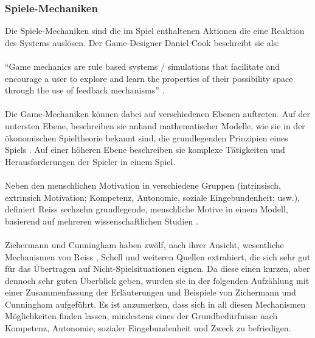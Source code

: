 \documentclass[a4paper,12pt]{scrartcl}
\begin{document}
\subsubsection{Spiele-Mechaniken}
Die Spiele-Mechaniken sind die im Spiel enthaltenen Aktionen die eine Reaktion des Systems auslösen. Der Game-Designer Daniel Cook beschreibt sie als:
\\\\
\enquote{Game mechanics are rule based systems / simulations that facilitate and encourage a user to explore and learn the properties of their possibility space through the use of feedback mechanisms} \cite{GameMechanics2006}. 
\\\\
Die Game-Mechaniken können dabei auf verschiedenen Ebenen auftreten. Auf der untersten Ebene, beschreiben sie anhand mathematischer Modelle, wie sie in der ökonomischen Spieltheorie bekannt sind, die grundlegenden Prinzipien eines Spiels \cite{Schell2014}. Auf einer höheren Ebene beschreiben sie komplexe Tätigkeiten und Herausforderungen der Spieler in einem Spiel.
\\\\
Neben den menschlichen Motivation in verschiedene Gruppen (intrinsisch, extrinsich Motivation; Kompetenz, Autonomie, soziale Eingebundenheit; usw.), definiert Reiss sechzehn grundlegende, menschliche Motive in einem Modell, basierend auf mehreren wissenschaftlichen Studien \cite{Reiss2009}.
\\\\
Zichermann und Cunningham \cite{Zichermann2011} haben zwölf, nach ihrer Ansicht, wesentliche Mechanismen von Reiss \cite{Reiss2009}, Schell \cite{Schell2014} und weiteren Quellen extrahiert, die sich sehr gut für das Übertragen auf Nicht-Spielsituationen eignen. Da diese einen kurzen, aber dennoch sehr guten Überblick geben, wurden sie in der folgenden Aufzählung mit einer Zusammenfassung der Erläuterungen und Beispiele von Zichermann und Cunningham  aufgeführt. Es ist anzumerken, dass sich in all diesen Mechanismen Möglichkeiten finden lassen, mindestens eines der Grundbedürfnisse nach Kompetenz, Autonomie, sozialer Eingebundenheit und Zweck zu befriedigen.     
\end{document}
